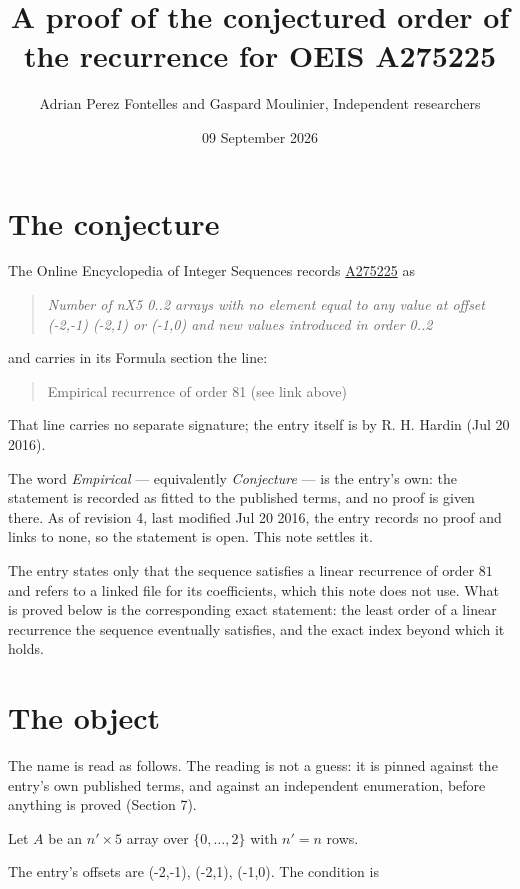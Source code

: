 \documentclass[11pt]{article}
\title{A proof of the conjectured order of the recurrence for OEIS A275225}
\author{Adrian Perez Fontelles and Gaspard Moulinier, Independent researchers}
\date{09 September 2026}
\theoremstyle{definition}
\begin{document}
\maketitle
\section{The conjecture}

The Online Encyclopedia of Integer Sequences records \href{https://oeis.org/A275225}{A275225} as

\begin{quote}\itshape Number of nX5 0..2 arrays with no element equal to any value at offset (-2,-1) (-2,1) or (-1,0) and new values introduced in order 0..2\end{quote}

and carries in its Formula section the line:

\begin{quote}\ttfamily Empirical recurrence of order 81 (see link above)\end{quote}

That line carries no separate signature; the entry itself is by R. H. Hardin (Jul 20 2016).

The word {\itshape Empirical} --- equivalently {\itshape Conjecture} --- is the entry's own: the statement is recorded as fitted to the published terms, and no proof is given there. As of revision 4, last modified Jul 20 2016, the entry records no proof and links to none, so the statement is open. This note settles it.

The entry states only that the sequence satisfies a linear recurrence of order $81$ and refers to a linked file for its coefficients, which this note does not use. What is proved below is the corresponding exact statement: the least order of a linear recurrence the sequence eventually satisfies, and the exact index beyond which it holds.

\section{The object}

The name is read as follows. The reading is not a guess: it is pinned against the entry's own published terms, and against an independent enumeration, before anything is proved (Section 7).

Let $A$ be an $n' \times 5$ array over $\{0,\dots,2\}$ with $n' = n$ rows.

The entry's offsets are (-2,-1), (-2,1), (-1,0). The condition is
\end{document}
